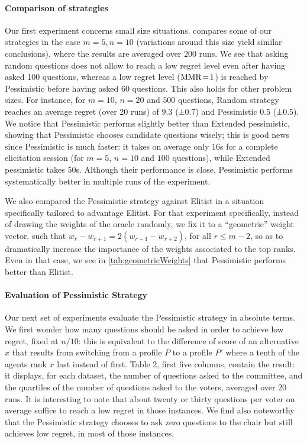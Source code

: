 \documentclass[runningheads]{llncs}
\theoremstyle{remark}
\begin{document}
\paragraph{Comparison of strategies}
Our first experiment concerns small size situations.
 compares some of our strategies in the case $m = 5, n = 10$ (variations around this size yield similar conclusions), where the results are averaged over $200$ runs.
We see that asking random questions does not allow to reach a low regret level even after having asked 100 questions, whereas a low regret level ($\operatorname{MMR} \!=\! 1$) is reached by Pessimistic before having asked 60 questions. This also holds for other problem sizes. For instance, for $m =10$, $n = 20$ and $500$ questions, Random strategy reaches an average regret (over 20 runs) of $9.3$ (±$ 0.7$) and Pessimistic $0.5$ (±$ 0.5$).
We notice that Pessimistic performs slightly better than Extended pessimistic, showing that Pessimistic chooses candidate questions wisely; this is good news since Pessimistic is much faster: it takes on average only $16$s for a complete elicitation session (for $m = 5$, $n = 10$ and $100$ questions), while Extended pessimistic takes $50$s. Although their performance is close, Pessimistic performs systematically better in multiple runs of the experiment.

We also compared the Pessimistic strategy against Elitist in a situation specifically tailored to advantage Elitist. For that experiment specifically, instead of drawing the weights of the oracle randomly, we fix it to a “geometric” weight vector, such that $w_r - w_{r + 1} = 2(w_{r + 1} - w_{r + 2})$, for all $r ≤ m - 2$, so as to dramatically increase the importance of the weights associated to the top ranks. Even in that case, we see in \cref{tab:geometricWeights} that Pessimistic performs better than Elitist.

\paragraph{Evaluation of Pessimistic Strategy}
\label{sec:lowRegret}
Our next set of experiments evaluate the Pessimistic strategy in absolute terms. 
We first wonder how many questions should be asked in order to achieve low regret, fixed at $n / 10$: this is equivalent to the difference of score of an alternative $x$ that results from switching from a profile $P$ to a profile $P'$ where a tenth of the agents rank $x$ last instead of first.
Table 2, first five columns, contain the result: it displays, for each dataset, the number of questions asked to the committee, and the quartiles of the number of questions asked to the voters, averaged over $20$ runs. It is interesting to note that about twenty or thirty questions per voter on average suffice to reach a low regret in those instances. We find also noteworthy that the Pessimistic strategy chooses to ask zero questions to the chair but still achieves low regret, in most of those instances.
\end{document}
